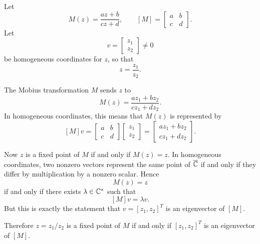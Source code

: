\documentclass{article}
\providecommand{\Chat}{\overline{\C}}
\begin{document}
\begin{solution}
  Let
  \[
    M(z)=\frac{az+b}{cz+d},
    \qquad
    [M]=
    \begin{bmatrix}
      a & b \\
      c & d
    \end{bmatrix}.
  \]
  Let
  \[
    v=
    \begin{bmatrix}
      z_1 \\
      z_2
    \end{bmatrix}
    \ne0
  \]
  be homogeneous coordinates for $z$, so that
  \[
    z=\frac{z_1}{z_2}.
  \]

  The Mobius transformation $M$ sends $z$ to
  \[
    M(z)
    =
    \frac{az_1+bz_2}{cz_1+dz_2}.
  \]
  In homogeneous coordinates, this means that $M(z)$ is represented by
  \[
    [M]v
    =
    \begin{bmatrix}
      a & b \\
      c & d
    \end{bmatrix}
    \begin{bmatrix}
      z_1 \\
      z_2
    \end{bmatrix}
    =
    \begin{bmatrix}
      az_1+bz_2 \\
      cz_1+dz_2
    \end{bmatrix}.
  \]

  Now $z$ is a fixed point of $M$ if and only if $M(z)=z$. In homogeneous
  coordinates, two nonzero vectors represent the same point of $\Chat$ if and
  only if they differ by multiplication by a nonzero scalar. Hence
  \[
    M(z)=z
  \]
  if and only if there exists $\lambda\in\mathbb{C}^\ast$ such that
  \[
    [M]v=\lambda v.
  \]
  But this is exactly the statement that $v=[z_1,z_2]^T$ is an eigenvector of
  $[M]$.

  Therefore $z=z_1/z_2$ is a fixed point of $M$ if and only if
  $[z_1,z_2]^T$ is an eigenvector of $[M]$.
\end{solution}
\end{document}
